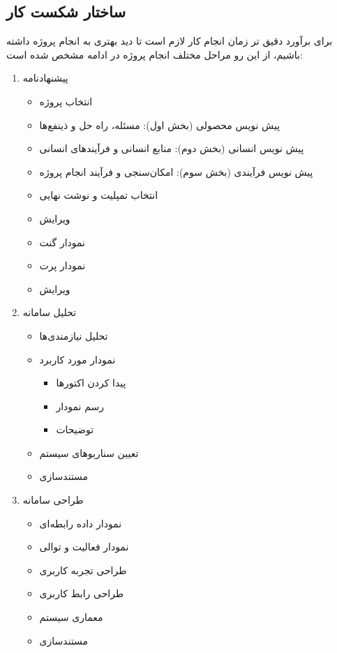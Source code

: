 \subsection{ساختار شکست کار
}
برای برآورد دقیق تر زمان انجام کار لازم است تا دید بهتری به انجام پروژه داشته باشیم، از این رو مراحل مختلف انجام پروژه در ادامه مشخص شده است:
\begin{enumerate}
	\item 
	پیشنهادنامه
	\begin{itemize}
		\item 
		انتخاب پروژه
		\item
		پیش نویس محصولی (بخش اول): مسئله، راه حل  و ذینفع‌ها
		\item
		پیش نویس انسانی (بخش دوم): منابع انسانی و فرآیند‌های انسانی
		\item
		پیش نویس فرآیندی (بخش سوم): امکان‌سنجی و فرآیند انجام پروژه
		\item
		انتخاب تمپلیت و نوشت نهایی
		\item
		ویرایش
		\item
		نمودار گنت
		\item
		نمودار پرت
		\item
		ویرایش
	\end{itemize}
	\item 
	تحلیل سامانه
	\begin{itemize}
		\item 
		تحلیل نیازمندی‌ها
		\item
		نمودار مورد کاربرد
		\begin{itemize}
			\item 
			پیدا کردن اکتورها
			\item 
			رسم نمودار
			\item 
			توضیحات
		\end{itemize}
		\item
		تعیین سناریوهای سیستم
		\item
		مستندسازی
	\end{itemize}
	\item 
	طراحی سامانه
	\begin{itemize}
		\item 
		نمودار داده رابطه‌ای
		\item 
		نمودار فعالیت و توالی
		\item
		طراحی تجربه کاربری
		\item
		 طراحی رابط کاربری
		 \item 
		معماری سیستم
		\item 
		مستندسازی
		

\end{itemize}
\end{enumerate}

